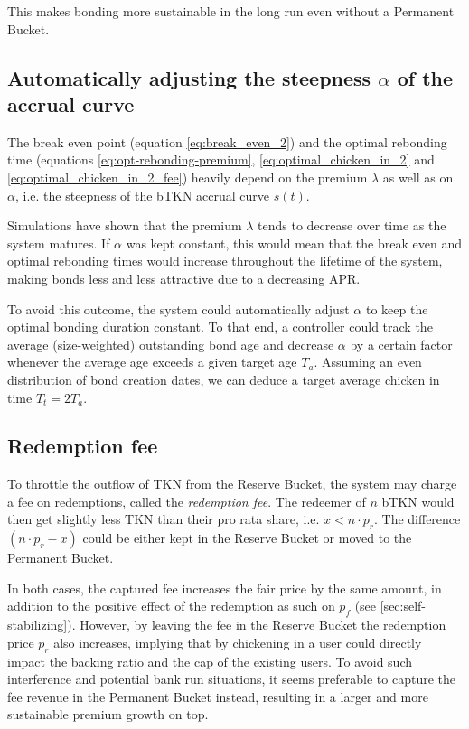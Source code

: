 \documentclass{article}
\begin{document}
This makes bonding more sustainable in the long run even without a Permanent Bucket.


\subsection{Automatically adjusting the steepness $\alpha$ of the accrual curve}
  \label{sec:adjustment}
The break even point (equation \ref{eq:break_even_2}) and the optimal rebonding time (equations \ref{eq:opt-rebonding-premium}, \ref{eq:optimal_chicken_in_2} and \ref{eq:optimal_chicken_in_2_fee}) heavily depend on the premium $\lambda$ as well as on $\alpha$, i.e. the steepness of the bTKN accrual curve $s(t)$. 

Simulations have shown that the premium $\lambda$ tends to decrease over time as the system matures. If  $\alpha$ was kept constant, this would mean that the break even and optimal rebonding times would increase throughout the lifetime of the system, making bonds less and less attractive due to a decreasing APR.

To avoid this outcome, the system could automatically adjust $\alpha$ to keep the optimal bonding duration constant. To that end, a controller could track the average (size-weighted) outstanding bond age and decrease $\alpha$ by a certain factor whenever the average age exceeds a given target age $T_a$. Assuming an even distribution of bond creation dates, we can deduce a target average chicken in time $T_t = 2T_a$.

\subsection{Redemption fee}
  \label{sec:redemption-fee}
To throttle the outflow of TKN from the Reserve Bucket, the system may charge a fee on redemptions, called the \textit{redemption fee}. The redeemer of $n$ bTKN would then get slightly less TKN than their pro rata share, i.e. $x < n \cdot p_r$. The difference $(n \cdot p_r - x)$ could be either kept in the Reserve Bucket or moved to the Permanent Bucket. 

In both cases, the captured fee increases the fair price by the same amount, in addition to the positive effect of the redemption as such on $p_f$ (see \ref{sec:self-stabilizing}). However, by leaving the fee in the Reserve Bucket the redemption price $p_r$ also increases, implying that by chickening in a user could directly impact the backing ratio and the cap of the existing users. To avoid such interference and potential bank run situations, it seems preferable to capture the fee revenue in the Permanent Bucket instead, resulting in a larger and more sustainable premium growth on top.  
\end{document}
